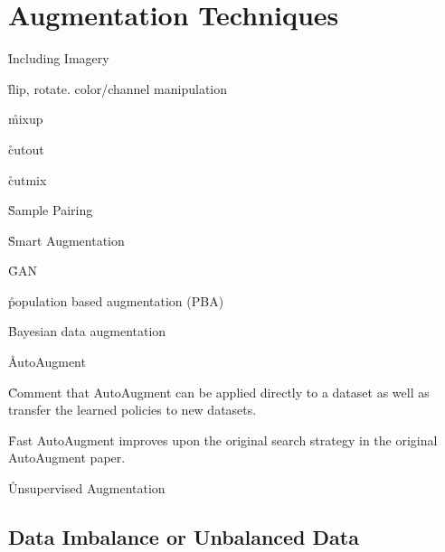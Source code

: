 \chapter{Augmentation Techniques}
\label{app_aug_techniques}

\r{Including Imagery}

\r{flip, rotate. color/channel manipulation}

\r{mixup\cite{zhang2017mixup}}

\r{cutout\cite{devries2017improved}}

\r{cutmix\cite{yun2019cutmix}}





\r{Sample Pairing\cite{inoue2018data}}

\r{Smart Augmentation\cite{lemley2017smart}}

\r{GAN\cite{shrivastava2017learning}}

\r{population based augmentation (PBA)\cite{ho2019population}}

\r{Bayesian data augmentation\cite{tran2017bayesian}}




\r{AutoAugment\cite{cubuk2018autoaugment}}

\r{Comment that AutoAugment can be applied directly to a dataset as well as transfer the learned policies to new datasets.}


\r{Fast AutoAugment\cite{lim2019fast} improves upon the original search strategy in the original AutoAugment paper.}

\r{Unsupervised Augmentation}


\section{Data Imbalance or Unbalanced Data}
\label{app_data_imbalance}

